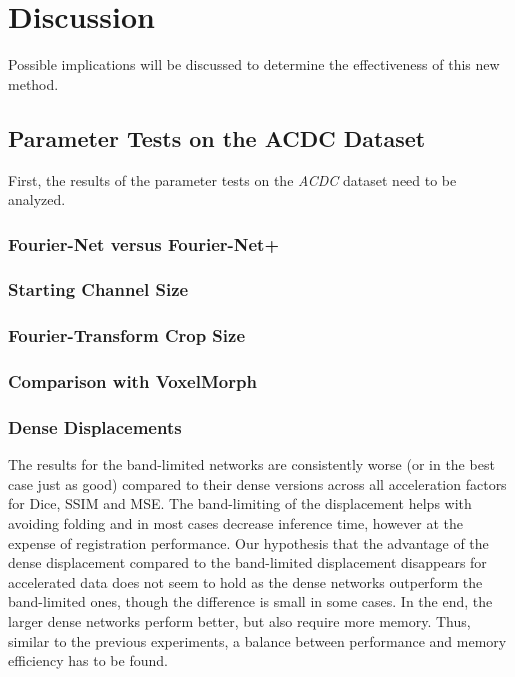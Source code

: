 
\chapter{Discussion} \label{Ch:Discussion}
Possible implications will be discussed to determine the effectiveness of this new method.

\section{Parameter Tests on the ACDC Dataset} \label{Sec:DiscussionParameterTestsACDC}
First, the results of the parameter tests on the \emph{ACDC} dataset need to be analyzed.

\subsection{Fourier-Net versus Fourier-Net+} \label{SubSec:DiscussionFourier-NetvsFourier-Net+ACDC}

\subsection{Starting Channel Size} \label{SubSec:DiscussionStartingChannelsACDC}

\subsection{Fourier-Transform Crop Size} \label{SubSec:DiscussionFTCropSize}

\subsection{Comparison with VoxelMorph} \label{SubSec:DiscussionComparisonVoxelMorph}


\subsection{Dense Displacements} \label{SubSec:DiscussionDenseDisplacements}
The results for the band-limited networks are consistently worse (or in the best case just as good) compared to their dense versions across all acceleration factors for Dice, SSIM and MSE. The band-limiting of the displacement helps with avoiding folding and in most cases decrease inference time, however at the expense of registration performance. Our hypothesis that the advantage of the dense displacement compared to the band-limited displacement disappears for accelerated data does not seem to hold as the dense networks outperform the band-limited ones, though the difference is small in some cases. In the end, the larger dense networks perform better, but also require more memory. Thus, similar to the previous experiments, a balance between performance and memory efficiency has to be found.

